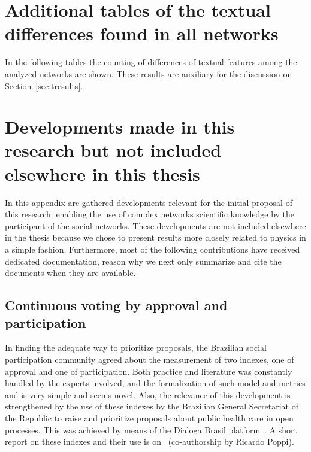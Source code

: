 
\begin{apendicesenv}
	\partapendices
	\chapter{Additional tables of the textual differences found in all networks}\label{ap:textd}
In the following tables the counting of differences of textual features among the analyzed networks
are shown.
	These results are auxiliary for the discussion on Section~\ref{sec:tresults}.
\FloatBarrier











\chapter{Developments made in this research but not included elsewhere in this thesis}\label{ap:vot}
In this appendix are gathered developments relevant for the initial proposal of this research:
enabling the use of complex networks scientific knowledge by the participant of the social networks.
These developments are not included elsewhere in the thesis because we chose to present results
more closely related to physics in a simple fashion.
Furthermore, most of the following contributions have received dedicated documentation,
reason why we next only summarize and cite the documents when they are available.

\section{Continuous voting by approval and participation}
In finding the adequate way to prioritize proposals, the Brazilian social participation community agreed about the measurement of two indexes,
one of approval and one of participation. Both practice and literature
was constantly handled by the experts involved, and the formalization
of such model and metrics and is very simple and seems novel.
Also, the relevance of this development is strengthened by the use of these indexes by the
Brazilian General Secretariat of the Republic to raise and prioritize
proposals about public health care in open processes.
This was achieved by means of the Dialoga Brasil platform~\cite{dialoga}.
A short report on these indexes and their use is on~\cite{dialogaAlg}
	(co-authorship by Ricardo Poppi).


\end{apendicesenv}
